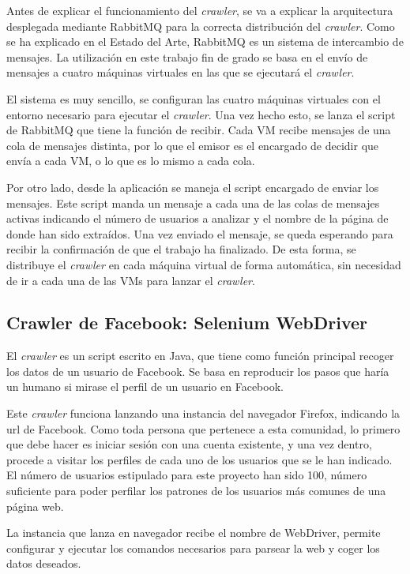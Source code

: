Antes de explicar el funcionamiento del \textit{crawler}, se va a explicar la arquitectura desplegada mediante RabbitMQ para la correcta distribución del \textit{crawler}. Como se ha explicado en el Estado del Arte, RabbitMQ es un sistema de intercambio de mensajes. La utilización en este trabajo fin de grado se basa en el envío de mensajes a cuatro máquinas virtuales en las que se ejecutará el \textit{crawler}. 

El sistema es muy sencillo, se configuran las cuatro máquinas virtuales con el entorno necesario para ejecutar el \textit{crawler}. Una vez hecho esto, se lanza el script de RabbitMQ que tiene la función de recibir. Cada VM recibe mensajes de una cola de mensajes distinta, por lo que el emisor es el encargado de decidir que envía a cada VM, o lo que es lo mismo a cada cola. 

Por otro lado, desde la aplicación se maneja el script encargado de enviar los mensajes. Este script manda un mensaje a cada una de las colas de mensajes activas indicando el número de usuarios a analizar y el nombre de la página de donde han sido extraídos. Una vez enviado el mensaje, se queda esperando para recibir la confirmación de que el trabajo ha finalizado. De esta forma, se distribuye el \textit{crawler} en cada máquina virtual de forma automática, sin necesidad de ir a cada una de las VMs para lanzar el \textit{crawler}.

\subsection{Crawler de Facebook: Selenium WebDriver} \label{sec:4.2.3}

El \textit{crawler} es un script escrito en Java, que tiene como función principal recoger los datos de un usuario de Facebook. Se basa en reproducir los pasos que haría un humano si mirase el perfil de un usuario en Facebook. 

Este \textit{crawler} funciona lanzando una instancia del navegador Firefox,  indicando la url de Facebook. Como toda persona que pertenece a esta comunidad, lo primero que debe hacer es iniciar sesión con una cuenta existente, y una vez dentro, procede a visitar los perfiles de cada uno de los usuarios que se le han indicado. El número de usuarios estipulado para este proyecto han sido 100, número suficiente para poder perfilar los patrones de los usuarios más comunes de una página web.

La instancia que lanza en navegador recibe el nombre de WebDriver, permite configurar y ejecutar los comandos necesarios para parsear la web y coger los datos deseados. 

